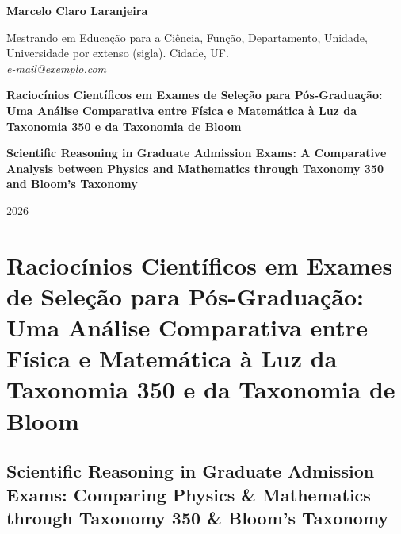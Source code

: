 \documentclass[
  12pt,
  a4paper,
  twoside,
  brazilian
]{article}
\begin{document}
\begin{titlepage}
  \begin{center}
    \vspace*{3cm}
    {\large\bfseries Marcelo Claro Laranjeira\par}
    \vspace{0.5cm}
    {\normalsize \lbrack Mestrando em Educação para a Ciência\rbrack, \lbrack Função\rbrack,
    \lbrack Departamento\rbrack, \lbrack Unidade\rbrack, \\
    \lbrack Universidade por extenso (sigla)\rbrack. \lbrack Cidade\rbrack, \lbrack UF\rbrack. \\
    \textit{\lbrack e-mail@exemplo.com\rbrack}\par}
    \vspace{3cm}
    {\LARGE\bfseries Raciocínios Científicos em Exames de Seleção para Pós-Graduação: Uma Análise Comparativa entre Física e Matemática à Luz da Taxonomia 350 e da Taxonomia de Bloom\par}
    \vspace{0.5cm}
    {\large\bfseries Scientific Reasoning in Graduate Admission Exams: A Comparative Analysis between Physics and Mathematics through Taxonomy 350 and Bloom's Taxonomy\par}
    \vfill
    {\large 2026\par}
  \end{center}
\end{titlepage}

\clearpage
{}
\tableofcontents
\newpage


  {\sloppy 
\section{Raciocínios Científicos em Exames de Seleção para
Pós-Graduação: Uma Análise Comparativa entre Física e Matemática à Luz
da Taxonomia 350 e da Taxonomia de
Bloom}\label{raciocuxednios-cientuxedficos-em-exames-de-seleuxe7uxe3o-para-puxf3s-graduauxe7uxe3o-uma-anuxe1lise-comparativa-entre-fuxedsica-e-matemuxe1tica-uxe0-luz-da-taxonomia-350-e-da-taxonomia-de-bloom}

  }%
\subsection{Scientific Reasoning in Graduate Admission Exams:
Comparing Physics \& Mathematics through Taxonomy
350 \& Bloom's
Taxonomy}\label{scientific-reasoning-in-graduate-admission-exams-a-comparative-analysis-between-physics-and-mathematics-through-taxonomy-350-and-blooms-taxonomy}
\end{document}
